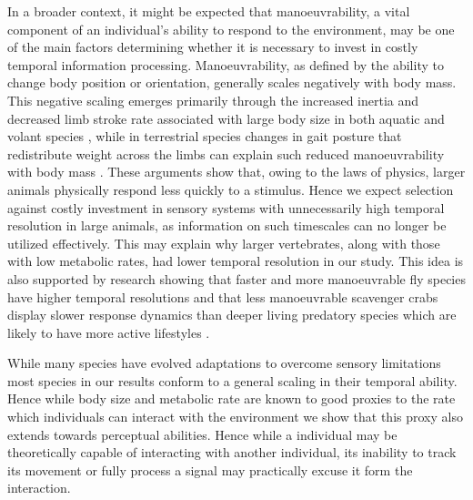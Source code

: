 In a broader context, it might be expected that manoeuvrability, a vital component of an individual's ability to respond to the environment, may be one of the main factors determining whether it is necessary to invest in costly temporal information processing. Manoeuvrability, as defined by the ability to change body position or orientation, generally scales negatively with body mass. This negative scaling emerges primarily through the increased inertia and decreased limb stroke rate associated with large body size in both aquatic and volant species \citep{dudley2002mechanisms,sato2007stroke,vogel2008modes,hedrick2011damping,watanabe2012slowest}, while in terrestrial species changes in gait posture that redistribute weight across the limbs can explain such reduced manoeuvrability with body mass \citep{heglund1988speed,biewener2003animal}. These arguments show that, owing to the laws of physics, larger animals physically respond less quickly to a stimulus. Hence we expect selection against costly investment in sensory systems with unnecessarily high temporal resolution in large animals, as information on such timescales can no longer be utilized effectively. This may explain why larger vertebrates, along with those with low metabolic rates, had lower temporal resolution in our study. This idea is also supported by research showing that faster and more manoeuvrable fly species have higher temporal resolutions \citep{laughlin1993fast} and that less manoeuvrable scavenger crabs display slower response dynamics than deeper living predatory species which are likely to have more active lifestyles \citep{frank2012light}.


While many species have evolved adaptations to overcome sensory limitations most species in our results conform to a general scaling in their temporal ability. Hence while body size and metabolic rate are known to good proxies to the rate which individuals can interact with the environment we show that this proxy also extends towards perceptual abilities. Hence while a individual may be theoretically capable of interacting with another individual, its inability to track its movement or fully process a signal may practically excuse it form the interaction.


